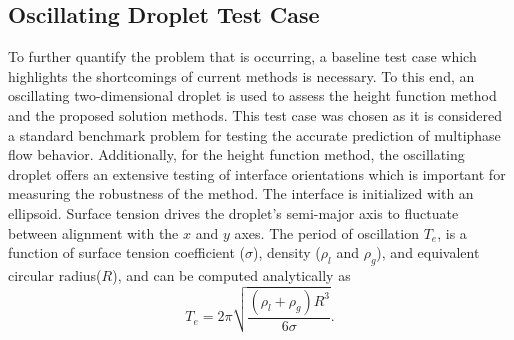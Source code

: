 \subsection{Oscillating Droplet Test Case}
To further quantify the problem that is occurring, a baseline test case which highlights the shortcomings of current methods is necessary. To this end, an oscillating two-dimensional droplet is used to assess the height function method and the proposed solution methods. This test case was chosen as it is considered a standard benchmark problem for testing the accurate prediction of multiphase flow behavior\cite{Salih2002}. Additionally, for the height function method, the oscillating droplet offers an extensive testing of interface orientations which is important for measuring the robustness of the method. The interface is initialized with an ellipsoid. Surface tension drives the droplet's semi-major axis to fluctuate between alignment with the $x$ and $y$ axes. The period of oscillation $T_{e}$, is a function of surface tension coefficient ($\sigma$), density ($\rho_l$ and $\rho_g$), and equivalent circular radius($R$), and can be computed analytically as~\cite{Rayleigh}
\begin{equation}
T_{e} = 2 \pi \sqrt{\frac{(\rho_{l}+\rho_{g})R^3}{6\sigma}}.
\label{period}
\end{equation}

